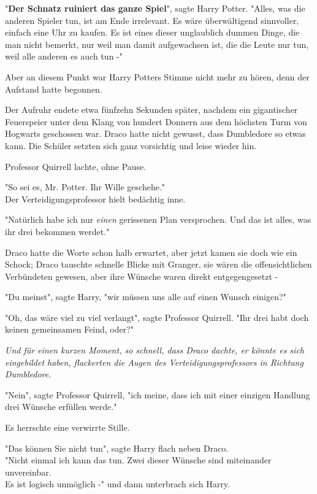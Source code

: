 {"\textbf{Der Schnatz ruiniert das ganze Spiel}", sagte Harry Potter. "Alles, was die anderen Spieler tun, ist am Ende irrelevant. Es wäre überwältigend sinnvoller, einfach eine Uhr zu kaufen. Es ist eines dieser unglaublich dummen Dinge, die man nicht bemerkt, nur weil man damit aufgewachsen ist, die die Leute nur tun, weil alle anderen es auch tun -"

Aber an diesem Punkt war Harry Potters Stimme nicht mehr zu hören, denn der Aufstand hatte begonnen.

Der Aufruhr endete etwa fünfzehn Sekunden später, nachdem ein gigantischer Feuerspeier unter dem Klang von hundert Donnern aus dem höchsten Turm von Hogwarts geschossen war. Draco hatte nicht gewusst, dass Dumbledore so etwas kann. Die Schüler setzten sich ganz vorsichtig und leise wieder hin.

Professor Quirrell lachte, ohne Pause.

"So sei es, Mr. Potter. Ihr Wille geschehe."\\ Der Verteidigungsprofessor hielt bedächtig inne.

"Natürlich habe ich nur \emph{einen} gerissenen Plan versprochen. Und das ist alles, was ihr drei bekommen werdet."

Draco hatte die Worte schon halb erwartet, aber jetzt kamen sie doch wie ein Schock; Draco tauschte schnelle Blicke mit Granger, sie wären die offensichtlichen Verbündeten gewesen, aber ihre Wünsche waren direkt entgegengesetzt -

"Du meinst", sagte Harry, "wir müssen uns alle auf einen Wunsch einigen?"

"Oh, das wäre viel zu viel verlangt", sagte Professor Quirrell. "Ihr drei habt doch keinen gemeinsamen Feind, oder?"

\emph{Und für einen kurzen Moment, so schnell, dass Draco dachte, er könnte es sich eingebildet haben, flackerten die Augen des Verteidigungsprofessors in Richtung Dumbledore.}

"Nein", sagte Professor Quirrell, "ich meine, dass ich mit einer einzigen Handlung drei Wünsche erfüllen werde."

Es herrschte eine verwirrte Stille.

"Das können Sie nicht tun", sagte Harry flach neben Draco.\\ "Nicht einmal ich kann das tun. Zwei dieser Wünsche sind miteinander unvereinbar.\\ Es ist logisch unmöglich -" und dann unterbrach sich Harry.

}
